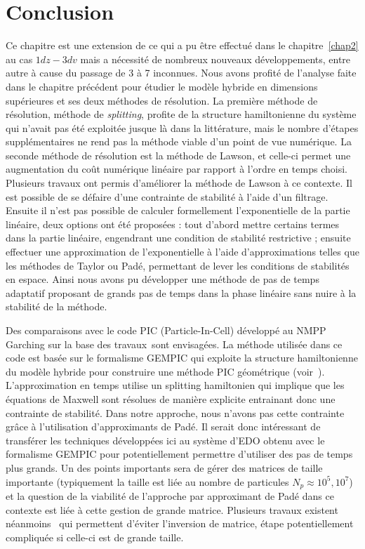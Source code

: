 
\section{Conclusion}

Ce chapitre est une extension de ce qui a pu être effectué dans le chapitre~\ref{chap2} au cas $1dz-3dv$ mais a nécessité de nombreux nouveaux développements, entre autre à cause du passage de 3 à 7 inconnues. Nous avons profité de l'analyse faite dans le chapitre précédent pour étudier le modèle hybride en dimensions supérieures et ses deux méthodes de résolution. La première méthode de résolution, méthode de \emph{splitting}, profite de la structure hamiltonienne du système qui n'avait pas été exploitée jusque là dans la littérature, mais le nombre d'étapes supplémentaires ne rend pas la méthode viable d'un point de vue numérique. La seconde méthode de résolution est la méthode de Lawson, et celle-ci permet une augmentation du coût numérique linéaire par rapport à l'ordre en temps choisi. Plusieurs travaux ont permis d'améliorer la méthode de Lawson à ce contexte. Il est possible de se défaire d'une contrainte de stabilité à l'aide d'un filtrage. Ensuite il n'est pas possible de calculer formellement l'exponentielle de la partie linéaire, deux options ont été proposées : tout d'abord mettre certains termes dans la partie linéaire, engendrant une condition de stabilité restrictive ; ensuite effectuer une approximation de l'exponentielle à l'aide d'approximations telles que les méthodes de Taylor ou Padé, permettant de lever les conditions de stabilités en espace. Ainsi nous avons pu développer une méthode de pas de temps adaptatif proposant de grands pas de temps dans la phase linéaire sans nuire à la stabilité de la méthode.

Des comparaisons avec le code PIC (Particle-In-Cell) développé au NMPP Garching sur la base des travaux~\cite{Holderied:2020}sont envisagées. La méthode utilisée dans ce code est basée sur le formalisme GEMPIC qui exploite la structure hamiltonienne du modèle hybride pour construire une méthode PIC géométrique (voir~\cite{Kraus:2017}). L’approximation en temps utilise un splitting hamiltonien qui implique que les équations de Maxwell sont résolues de manière explicite entrainant donc une contrainte de stabilité. Dans notre approche, nous n’avons pas cette contrainte grâce à l’utilisation d’approximants de Padé. Il serait donc intéressant de transférer les techniques développées ici au système d’EDO obtenu avec le formalisme GEMPIC pour potentiellement permettre d’utiliser des pas de temps plus grands. Un des points importants sera de gérer des matrices de taille importante (typiquement la taille est liée au nombre de particules $N_p\approx 10^5, 10^7$) et la question de la viabilité de l’approche par approximant de Padé dans ce contexte est liée à cette gestion de grande matrice. Plusieurs travaux existent néanmoins~\cite{Li:2011} qui permettent d'éviter l'inversion de matrice, étape potentiellement compliquée si celle-ci est de grande taille.

